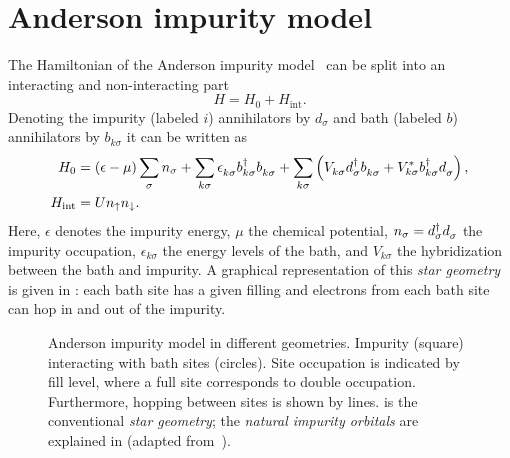 \section{Anderson impurity model}%
\label{sec:anderson-impurity-model}

The Hamiltonian of the Anderson impurity model~\cite{Anderson1961} can be split into
an interacting and non-interacting part
\begin{equation}
    H = H_0 + H_\mathrm{int}.
    \label{eq:impurity-Hamiltonian}
\end{equation}
Denoting the impurity (labeled $i$) annihilators by $d_\sigma$
and bath (labeled $b$) annihilators by $b_{k\sigma}$
it can be written as
\begin{align}
    H_0
     & =
    (\epsilon - \mu) \sum_{\pk\sigma} n_\sigma
    +
    \sum_{k\sigma} \epsilon_{k\sigma}^{\pdag} b^\dag_{k\sigma} b^{\pdag}_{k\sigma}
    +
    \sum_{k\sigma} \left(V^{\ps}_{k\sigma} d^\dag_{\pk\sigma} b^{\pdag}_{k\sigma}
    + V_{k\sigma}^* b^\dag_{k\sigma} d^{\pdag}_{\pk\sigma} \right),
    \label{eq:anderson-non-interacting}
    \\
    H_\mathrm{int}
     & =
    U n_\uparrow n_\downarrow.
    \label{eq:anderson-interaction}
\end{align}
Here,
$\epsilon$ denotes the impurity energy,
$\mu$ the chemical potential,
$n_\sigma = d^\dag_\sigma d^{\pdag}_\sigma$ the impurity occupation,
$\epsilon_{k\sigma}$ the energy levels of the bath,
and $V_{k\sigma}$ the hybridization between the bath and impurity.
A graphical representation of this \emph{star geometry} is given in :
each bath site has a given filling
and electrons from each bath site can hop in and out of the impurity.

\begin{figure}[ht]
    \centering
    \savebox{\imagebox}{} %
    \begin{subfigure}{0.45\textwidth}
        \centering
        \usebox{\imagebox}
        \caption{}%
        \label{subfig:geometry-star}
    \end{subfigure}
    \begin{subfigure}{0.45\textwidth}
        \centering
        \raisebox{\dimexpr0.5\ht\imagebox-0.5\height}
        {
            
        }
        \caption{}%
        \label{subfig:geometry-natural-impurity-orbitals}
    \end{subfigure}
    \caption{
        Anderson impurity model in different geometries.
        Impurity (square) interacting with bath sites (circles).
        Site occupation is indicated by fill level,
        where a full site corresponds to double occupation.
        Furthermore, hopping between sites is shown by lines.
         is the conventional \emph{star geometry};
         the \emph{natural impurity orbitals}
        are explained in 
        (adapted from~\cite{Lu2019}).
    }
\end{figure}

